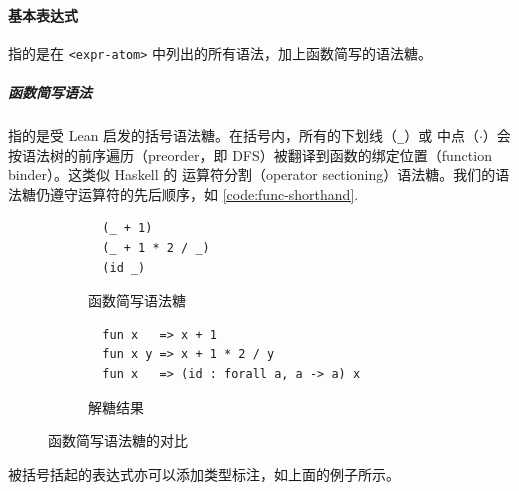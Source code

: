 \documentclass[a4paper, 11pt]{article}
\theoremstyle{remark}\newtheorem*{remark}{Remark}
\theoremstyle{definition}\newtheorem*{definition}{Definition}
\begin{document}
\paragraph*{基本表达式} 指的是在 \texttt{<expr-atom>} 中列出的所有语法，加上函数简写的语法糖。
\subparagraph*{函数简写语法} 指的是受 Lean 启发的括号语法糖。在括号内，所有的下划线（\texttt{\_}）或
中点（$\cdot$）会按语法树的前序遍历（preorder，即 DFS）被翻译到函数的绑定位置（function binder）。这类似 Haskell 的
运算符分割（operator sectioning）语法糖。我们的语法糖仍遵守运算符的先后顺序，如 \autoref{code:func-shorthand}.
\begin{figure}[H]
  \centering
  \begin{subfigure}{0.5\textwidth}\centering
\begin{verbatim}
  (_ + 1)
  (_ + 1 * 2 / _)
  (id _)
\end{verbatim}
    \caption{函数简写语法糖}
  \end{subfigure}%
  \begin{subfigure}{0.5\textwidth}\centering
\begin{verbatim}
  fun x   => x + 1
  fun x y => x + 1 * 2 / y
  fun x   => (id : forall a, a -> a) x
\end{verbatim}
    \caption{解糖结果}
  \end{subfigure}
  \caption{函数简写语法糖的对比}\label{code:func-shorthand}
\end{figure}
被括号括起的表达式亦可以添加类型标注，如上面的例子所示。
\end{document}
